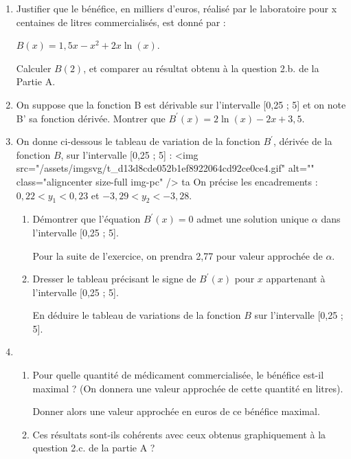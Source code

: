 \begin{enumerate}
     \item
     Justifier que le bénéfice, en milliers d'euros, réalisé par le laboratoire pour x centaines de litres commercialisés, est donné par :
     \par
     $B\left(x\right)=1,5x-x^{2}+2x \ln \left(x\right)$.
     \par
     Calculer $B\left(2\right)$, et comparer au résultat obtenu à la question 2.b. de la Partie A.
     \item
     On suppose que la fonction B est dérivable sur l'intervalle [0,25 ; 5] et on note B' sa fonction dérivée. Montrer que $B^{\prime}\left(x\right)=2\ln \left(x\right)-2x+3,5$.
     \item
     On donne ci-dessous le tableau de variation de la fonction $B^{\prime}$, dérivée de la fonction $B$, sur l'intervalle [0,25 ; 5] :
     <img src="/assets/imgsvg/t_d13d8cde052b1ef8922064cd92ce0ce4.gif" alt="" class="aligncenter size-full  img-pc" />
ta
     On précise les encadrements : $0,22 < y_{1} < 0,23$ et $-3,29 < y_{2}  < -3,28$.
     \begin{enumerate}[label=\alph*.] 
          \item
          Démontrer que l'équation $B^{\prime}\left(x\right)=0$ admet une solution unique $\alpha $ dans l'intervalle [0,25 ; 5].
          \par
          Pour la suite de l'exercice, on prendra 2,77 pour valeur approchée de $\alpha $.
          \item
          Dresser le tableau précisant le signe de $B^{\prime}\left(x\right)$ pour $x$ appartenant à l'intervalle [0,25 ; 5].
          \par
          En déduire le tableau de variations de la fonction $B$ sur l'intervalle [0,25 ; 5].
     \end{enumerate}
     \item
     \begin{enumerate}[label=\alph*.] 
          \item
          Pour quelle quantité de médicament commercialisée, le bénéfice est-il maximal ? (On donnera une valeur approchée de cette quantité en litres).
          \par
          Donner alors une valeur approchée en euros de ce bénéfice maximal.
          \item
          Ces résultats sont-ils cohérents avec ceux obtenus graphiquement à la question 2.c. de la partie A ?
     \end{enumerate}
\end{enumerate}
